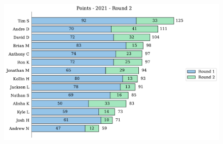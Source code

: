 \documentclass[10pt]{article}
\begin{document}
\begin{minipage}[t]{13cm}
    \begin{figure}[H]
        \vspace{-3.5cm}
        \includegraphics[width=12cm]{../../figures/2021/Points-2021-Round2.pdf}
    \end{figure}
\end{minipage}
\end{document}
